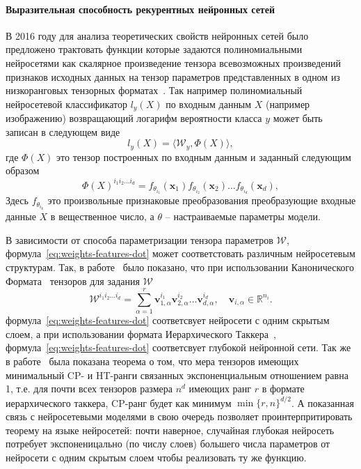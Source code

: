 \paragraph{Выразительная способность рекурентных нейронных сетей}
В 2016 году для анализа теоретических свойств нейронных сетей было предложено трактовать функции которые задаются полиномиальными нейросетями как скалярное произведение тензора всевозможных произведений признаков исходных данных на тензор параметров представленных в одном из низкоранговых тензорных форматах~\cite{cohen2016expressive}. Так например полиномиальный нейросетевой классификатор $l_y(X)$ по входным данным $X$ (например изображению) возвращающий логарифм вероятности класса $y$ может быть записан в следующем виде
\begin{equation}\label{eq:weights-features-dot}
l_y(X) = \langle  \mathcal{W}_y, \Phi(X) \rangle,
\end{equation}
где $\Phi(X)$ это тензор построенных по входным данным и заданный следующим образом
\begin{equation}\label{eq:feature-tens}
\Phi(X)^{i_1 i_2 \hdots i_d} = f_{\theta_{i_1}} (\textbf{x}_1) f_{\theta_{i_2}}(\textbf{x}_2) \hdots f_{\theta_{i_d}} (\textbf{x}_d),
\end{equation}
Здесь $f_{\theta_{i_k}}$ это произвольные признаковые преобразования преобразующие входные данные $X$ в вещественное число, а $\theta$ -- настраиваемые параметры модели.

В зависимости от способа параметризации тензора параметров $\mathcal{W}$, формула~\eqref{eq:weights-features-dot} может соответстовать различным нейросетевым структурам. Так, в работе~\cite{cohen2016expressive} было показано, что при использовании Канонического Формата~\cite{harshman1970foundations,carroll1970analysis} тензоров для задания $\mathcal{W}$
\begin{equation}\label{eq:candec}
\mathcal{W}^{i_1 i_2 \hdots i_d} = \sum_{\alpha=1}^{r} \textbf{v}_{1, \alpha}^{i_1}\textbf{v}_{2, \alpha}^{i_2} \hdots 
 \textbf{v}_{d, \alpha}^{i_d}, \quad \textbf{v}_{i, \alpha} \in \mathbb{R}^{n_i}.
\end{equation}
формула~\eqref{eq:weights-features-dot} соответсвует нейросети с одним скрытым слоем, а при использовании формата Иерархического Таккера~\cite{grasedyck2010hierarchical, grasedyck2011introduction, hackbusch2012tensor}, формула~\eqref{eq:weights-features-dot} соответсвует глубокой нейронной сети. Так же в работе~\cite{cohen2016expressive} была показана теорема о том, что мера тензоров имеющих минимальный CP- и HT-ранги связанных экспоненциальным отношением равна 1, т.е. для почти всех тензоров размера $n^d$ имеющих ранг $r$ в формате иерархического таккера, CP-ранг будет как минимум $\min\{r, n\}^{d/2}$. А показанная связь с нейросетевыми моделями в свою очередь позволяет проинтерпритировать теорему на языке нейросетей: почти наверное, случайная глубокая нейросеть потребует экспоненицально (по числу слоев) большего числа параметров от нейросети с одним скрытым слоем чтобы реализовать ту же функцию.

